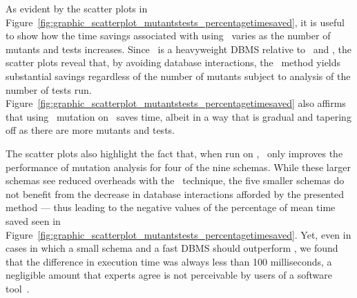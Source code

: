 

 As evident by the scatter plots in Figure~\ref{fig:graphic_scatterplot_mutantstests_percentagetimesaved}, it is useful to show how the time savings associated with using \virtualmutationanalysis~varies as the number of mutants and tests increases. Since \postgres~is a heavyweight DBMS relative to \HyperSQL~and \sqlite, the scatter plots reveal that, by avoiding database interactions, the \virtual~method yields substantial savings regardless of the number of mutants subject to analysis of the number of tests run.  Figure~\ref{fig:graphic_scatterplot_mutantstests_percentagetimesaved} also affirms that using \virtual~mutation on \HyperSQL~saves time, albeit in a way that is gradual and tapering off as there are more mutants and tests.


The scatter plots also highlight the fact that, when run on \sqlite, \virtual~only improves the performance of mutation analysis for four of the nine schemas. While these larger schemas see reduced overheads with the \virtual~technique, the five smaller schemas do not benefit from the decrease in database interactions afforded by the presented method --- thus leading to the negative values of the percentage of mean time saved seen in Figure~\ref{fig:graphic_scatterplot_mutantstests_percentagetimesaved}. Yet, even in cases in which a small schema and a fast DBMS should outperform \vma, we found that the difference in execution time was always less than 100 milliseconds, a negligible amount that experts agree is not perceivable by users of a software tool~\cite{Neumann2015}.


